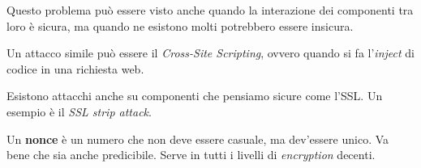 Questo problema può essere visto anche quando la interazione dei componenti tra 
loro è sicura, ma quando ne esistono molti potrebbero essere insicura.

Un attacco simile può essere il \textit{Cross-Site Scripting}, ovvero quando si 
fa l'\textit{inject} di codice in una richiesta web.


Esistono attacchi anche su componenti che pensiamo sicure come l'SSL. Un esempio 
è il \textit{SSL strip attack}.

Un \textbf{nonce} è un numero che non deve essere casuale, ma dev'essere unico. 
Va bene che sia anche predicibile. Serve in tutti i livelli di 
\textit{encryption} decenti.

